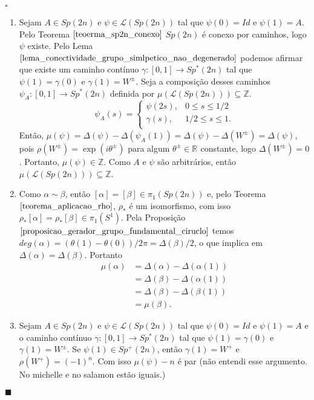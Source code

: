 \documentclass[12pt]{book}
\newenvironment{prova}[1]{$\square$ #1}{\hfill$\blacksquare$}
\newcommand{\circulo}{S^{1}}
\newcommand{\classe}[1]{[#1]}
\newcommand{\funcaocond}[5]{
	#1 = 
	\left\{
	\begin{array}{cc}
		#2, & #3\\
		#4, & #5\\
	\end{array}
	\right.
}
\newcommand{\grupofundamental}[1]{\pi_{1}(#1)}
\newcommand{\gruposimpletico}[1]{Sp(#1)}
\newcommand{\gruposimpleticonaodegenerado}[1]{Sp^{#1}(2n)}
\newcommand{\inteiros}{\mathbb{Z}}
\newcommand{\real}[1]{\mathbb{R}^{#1}}
\newcommand{\reta}{\real{}}
\newcommand{\vermelho}[1]{{\color{red}#1}}
\begin{document}
	\begin{prova}
		\begin{enumerate}
			\item Sejam $A \in \gruposimpletico{2n}$ e $\psi \in \mathcal{L}(\gruposimpletico{2n})$ tal que $\psi(0) = Id $ e $\psi(1) = A$. Pelo Teorema $\ref{teoerma_sp2n_conexo}$ $\gruposimpletico{2n}$ é conexo por caminhos, logo $\psi$ existe. Pelo Lema $\ref{lema_conectividade_grupo_simlpetico_nao_degenerado}$ podemos afirmar que existe um caminho contínuo $\gamma:[0,1] \to \gruposimpleticonaodegenerado{*}$ tal que $\psi(1) = \gamma(0)$ e $\gamma(1)= W^{\pm}$. Seja a composição desses caminhos $\psi_{A}:[0,1]\to \gruposimpleticonaodegenerado{*}$ definida por
			$\mu(\mathcal{L}(\gruposimpletico{2n})) \subseteq \inteiros$.
			$$	
			\funcaocond{\psi_{A}(s)
			}{\psi(2s)}{0\leq s \leq 1/2}{\gamma(s)}{1/2\leq s \leq 1.}
			$$
			Então, $\mu(\psi) = \varDelta(\psi) - \varDelta(\psi_{A}(1)) = \varDelta(\psi) - \varDelta(W^{\pm})= \varDelta(\psi)$, pois $\rho(W^{\pm})= \exp(i\theta^{\pm})$ para algum $\theta^{\pm} \in \reta$ constante, logo $\varDelta(W^{\pm}) = 0$. Portanto, $\mu(\psi) \in \inteiros$. Como $A$ e $\psi$ são arbitrários, então $\mu (\mathcal{L}(\gruposimpletico{2n})) \subseteq \inteiros$.
			
			\item Como $\alpha \sim \beta$, então $\classe{\alpha} = \classe{\beta} \in \grupofundamental{\gruposimpletico{2n}}$ e, pelo Teorema $\ref{teorema_aplicacao_rho}$, $\rho_{*}$ é um isomorfismo, com isso $\rho_{*}[\alpha] = \rho_{*}[\beta] \in \grupofundamental{\circulo}$. Pela Proposição $\ref{proposicao_gerador_grupo_fundamental_ciruclo}$ temos $deg(\alpha) = (\theta(1)-\theta(0))/2\pi = \varDelta(\beta)/2$, o que implica em $\varDelta(\alpha) = \varDelta(\beta)$. Portanto
			$$
			\begin{aligned}
			\mu(\alpha) 
			&= \varDelta(\alpha) - \varDelta(\alpha(1)) 
			\\
			&= \varDelta(\beta) - \varDelta(\alpha(1)) 
			\\
			&= \varDelta(\beta) - \varDelta(\beta(1)) 
			\\
			&= \mu(\beta).
			\end{aligned}
			$$
			
			\item Sejam $A \in \gruposimpletico{2n}$ e $\psi \in \mathcal{L}(\gruposimpletico{2n})$ tal que $\psi(0) = Id $ e $\psi(1) = A$ e o caminho contínuo $\gamma:[0,1] \to \gruposimpleticonaodegenerado{*}$ tal que $\psi(1) = \gamma(0)$ e $\gamma(1)= W^{\pm}$. Se $\psi(1) \in \gruposimpleticonaodegenerado{+}$, então $\gamma(1) = W^{+}$ e \vermelho{$\rho(W^{+}) = (-1)^{n}$}. Com isso $\mu(\psi) - n$ é par \vermelho{(não entendi esse argumento. No michelle e no salamon estão iguais.)}
			

\end{enumerate}
\end{prova}
\end{document}
